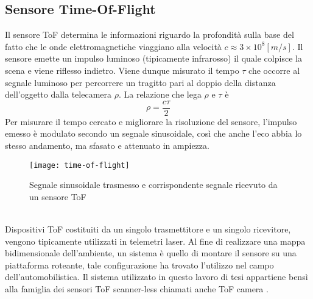 \subsection{Sensore Time-Of-Flight}
Il sensore ToF determina le informazioni riguardo la profondità sulla base del fatto che le onde elettromagnetiche viaggiano alla velocità \(c\approx3\times 10^8[m/s]\). Il sensore emette un impulso luminoso (tipicamente infrarosso) il quale colpisce la scena e viene riflesso indietro. Viene dunque misurato il tempo $\tau$ che occorre al segnale luminoso per percorrere un tragitto pari al doppio della distanza dell'oggetto dalla telecamera $\rho$. La relazione che lega $\rho$ e $\tau$ è $$\rho=\frac{c\tau}{2}$$
Per misurare il tempo cercato e migliorare la risoluzione del sensore, l'impulso emesso è modulato secondo un segnale sinusoidale, così che anche l'eco abbia lo stesso andamento, ma
sfasato e attenuato in ampiezza.
\begin{figure}[ht]
    \centering
    \texttt{[image: time-of-flight]}
    \caption[Principio time-of-flight]{Segnale sinusoidale trasmesso e corrispondente segnale ricevuto da un sensore ToF}
\end{figure}\\
Dispositivi ToF costituiti da un singolo trasmettitore e un singolo ricevitore, vengono tipicamente utilizzati in telemetri laser. Al fine di realizzare una mappa bidimensionale dell'ambiente, un sistema è quello di montare il sensore su una piattaforma roteante, tale configurazione ha trovato l'utilizzo nel campo dell'automobilistica. Il sistema utilizzato in questo lavoro di tesi appartiene bensì alla famiglia dei sensori ToF scanner-less chiamati anche ToF camera \cite{rif1}.
